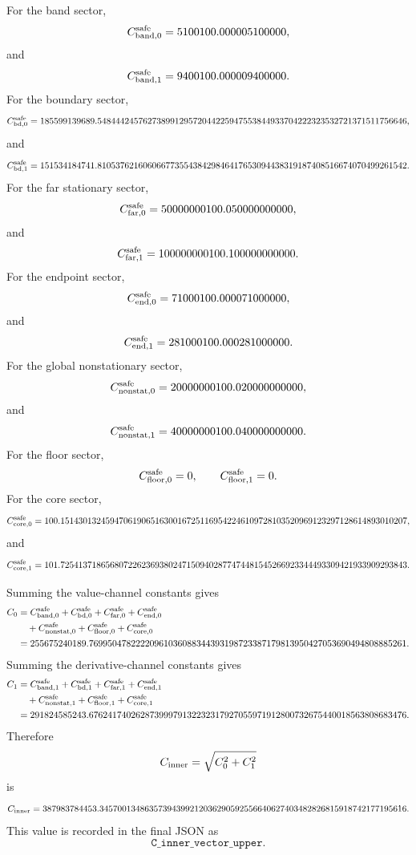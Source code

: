 \documentclass[11pt]{article}
\newcommand{\Czero}{C_0}
\newcommand{\Cone}{C_1}
\newcommand{\Cinner}{C_{\rm inner}}
\newcommand{\JSON}[1]{\texttt{#1}}
\begin{document}
For the band sector,
\[
        C_{{\rm band},0}^{\rm safe}
        =
        5100100.000005100000,
\]
and
\[
        C_{{\rm band},1}^{\rm safe}
        =
        9400100.000009400000.
\]
For the boundary sector,
\[
        C_{{\rm bd},0}^{\rm safe}
        =
        185599139689.54844424576273899129572044225947553844933704222323532721371511756646,
\]
and
\[
        C_{{\rm bd},1}^{\rm safe}
        =
        151534184741.81053762160606677355438429846417653094438319187408516674070499261542.
\]
For the far stationary sector,
\[
        C_{{\rm far},0}^{\rm safe}
        =
        50000000100.050000000000,
\]
and
\[
        C_{{\rm far},1}^{\rm safe}
        =
        100000000100.100000000000.
\]
For the endpoint sector,
\[
        C_{{\rm end},0}^{\rm safe}
        =
        71000100.000071000000,
\]
and
\[
        C_{{\rm end},1}^{\rm safe}
        =
        281000100.000281000000.
\]
For the global nonstationary sector,
\[
        C_{{\rm nonstat},0}^{\rm safe}
        =
        20000000100.020000000000,
\]
and
\[
        C_{{\rm nonstat},1}^{\rm safe}
        =
        40000000100.040000000000.
\]
For the floor sector,
\[
        C_{{\rm floor},0}^{\rm safe}=0,
        \qquad
        C_{{\rm floor},1}^{\rm safe}=0.
\]
For the core sector,
\[
        C_{{\rm core},0}^{\rm safe}
        =
        100.15143013245947061906516300167251169542246109728103520969123297128614893010207,
\]
and
\[
        C_{{\rm core},1}^{\rm safe}
        =
        101.72541371865680722623693802471509402877474481545266923344493309421933909293843.
\]

Summing the value-channel constants gives
\[
\begin{aligned}
        \Czero
        &=
        C_{{\rm band},0}^{\rm safe}
        +
        C_{{\rm bd},0}^{\rm safe}
        +
        C_{{\rm far},0}^{\rm safe}
        +
        C_{{\rm end},0}^{\rm safe}
        \\
        &\quad
        +
        C_{{\rm nonstat},0}^{\rm safe}
        +
        C_{{\rm floor},0}^{\rm safe}
        +
        C_{{\rm core},0}^{\rm safe}
        \\
        &=
        255675240189.76995047822220961036088344393198723387179813950427053690494808885261.
\end{aligned}
\]
Summing the derivative-channel constants gives
\[
\begin{aligned}
        \Cone
        &=
        C_{{\rm band},1}^{\rm safe}
        +
        C_{{\rm bd},1}^{\rm safe}
        +
        C_{{\rm far},1}^{\rm safe}
        +
        C_{{\rm end},1}^{\rm safe}
        \\
        &\quad
        +
        C_{{\rm nonstat},1}^{\rm safe}
        +
        C_{{\rm floor},1}^{\rm safe}
        +
        C_{{\rm core},1}^{\rm safe}
        \\
        &=
        291824585243.67624174026287399979132232317927055971912800732675440018563808683476.
\end{aligned}
\]
Therefore
\[
        \Cinner
        =
        \sqrt{\Czero^2+\Cone^2}
\]
is
\[
        \Cinner
        =
        387983784453.34570013486357394399212036290592556640627403482826815918742177195616.
\]
This value is recorded in the final JSON as
\[
        \JSON{C\_inner\_vector\_upper}.
\]
\end{document}
